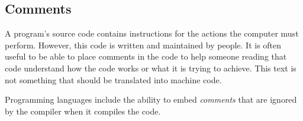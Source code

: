 \clearpage
\subsection{Comments} %
\label{sub:comments}

A program's source code contains instructions for the actions the computer must perform. However, this code is written and maintained by people. It is often useful to be able to place comments in the code to help someone reading that code understand how the code works or what it is trying to achieve. This text is not something that should be translated into machine code.

Programming languages include the ability to embed \emph{comments} that are ignored by the compiler when it compiles the code.

\bigskip


